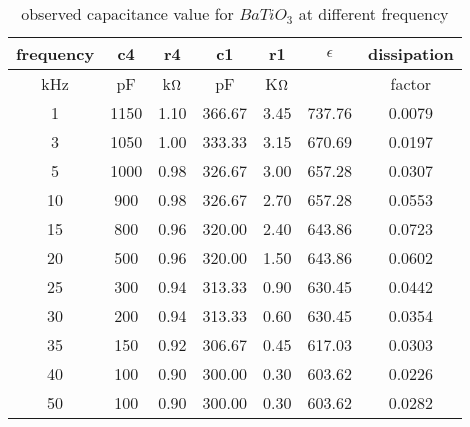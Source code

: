 \begin{table}[H]
    \centering
    \begin{tabular}{|c|c|c|c|c|c|c|}
        \hline
        frequency & c4   & r4      & c1     & r1      & $\epsilon$ & dissipation \\ \hline
        kHz       & pF   & k$\ohm$ & pF     & K$\ohm$ & ~          & factor      \\ \hline
        1         & 1150 & 1.10    & 366.67 & 3.45    & 737.76     & 0.0079      \\ \hline
        3         & 1050 & 1.00    & 333.33 & 3.15    & 670.69     & 0.0197      \\ \hline
        5         & 1000 & 0.98    & 326.67 & 3.00    & 657.28     & 0.0307      \\ \hline
        10        & 900  & 0.98    & 326.67 & 2.70    & 657.28     & 0.0553      \\ \hline
        15        & 800  & 0.96    & 320.00 & 2.40    & 643.86     & 0.0723      \\ \hline
        20        & 500  & 0.96    & 320.00 & 1.50    & 643.86     & 0.0602      \\ \hline
        25        & 300  & 0.94    & 313.33 & 0.90    & 630.45     & 0.0442      \\ \hline
        30        & 200  & 0.94    & 313.33 & 0.60    & 630.45     & 0.0354      \\ \hline
        35        & 150  & 0.92    & 306.67 & 0.45    & 617.03     & 0.0303      \\ \hline
        40        & 100  & 0.90    & 300.00 & 0.30    & 603.62     & 0.0226      \\ \hline
        50        & 100  & 0.90    & 300.00 & 0.30    & 603.62     & 0.0282      \\ \hline
    \end{tabular}
    \caption{observed capacitance value for $BaTiO_3$ at different frequency}
    \label{tab:1}
\end{table}